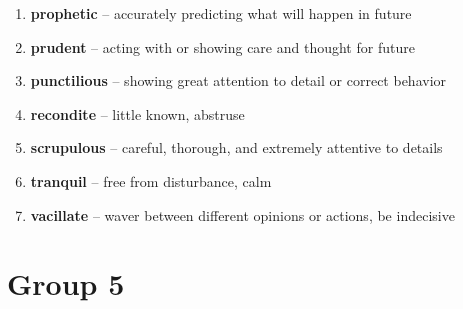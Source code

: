 \begin{enumerate}[wide,labelindent=0pt]
\item \textbf{prophetic} -- accurately predicting what will happen in future
\item \textbf{prudent} -- acting with or showing care and thought for future
\item \textbf{punctilious} -- showing great attention to detail or correct behavior
\item \textbf{recondite} -- little known, abstruse
\item \textbf{scrupulous} -- careful, thorough, and extremely attentive to details
\item \textbf{tranquil} -- free from disturbance, calm
\item \textbf{vacillate} -- waver between different opinions or actions, be indecisive
\end{enumerate}

\newpage
\section{Group 5}

